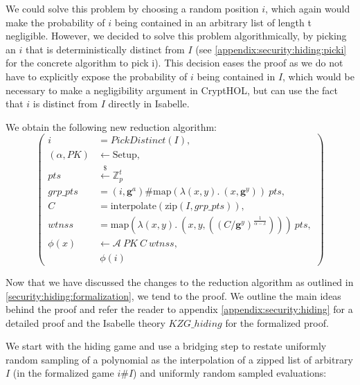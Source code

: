 We could solve this problem by choosing a random position $i$, which again would make the probability of $i$ being contained in an arbitrary list of length t negligible. However, we decided to solve this problem algorithmically, by picking an $i$ that is deterministically distinct from $I$ (see \ref{appendix:security:hiding:picki} for the concrete algorithm to pick i). This decision eases the proof as we do not have to explicitly expose the probability of $i$ being contained in $I$, which would be necessary to make a negligibility argument in CryptHOL, but can use the fact that $i$ is distinct from $I$ directly in Isabelle.

We obtain the following new reduction algorithm: 
\begin{equation*}
    \left(
        \begin{aligned}
            i &= PickDistinct(I), \\
            (\alpha,PK) & \leftarrow \text{Setup}, \\
            pts & \overset{{\scriptscriptstyle\$}}{\leftarrow} \mathbb{Z}_p^t\\
            grp\_pts &= (i,\mathbf{g}^a)\#\text{map} (\lambda (x,y).\ (x,\mathbf{g}^y))\ pts,\\
            C &= \text{interpolate} (\text{zip}(I,grp\_pts)),\\ 
            wtnss &= \text{map} (\lambda (x,y).\ (x,y, ((C/\mathbf{g}^y)^{\frac{1}{\alpha-x}})))\ pts,\\
            \phi(x) & \leftarrow \mathcal{A}\ PK \ C\ wtnss, \\
            & \ \phi(i)
        \end{aligned}
    \right)
\end{equation*}

Now that we have discussed the changes to the reduction algorithm as outlined in \ref{security:hiding:formalization}, we tend to the proof. We outline the main ideas behind the proof and refer the reader to appendix \ref{appendix:security:hiding} for a detailed proof and the Isabelle theory $KZG\_hiding$ for the formalized proof.

We start with the hiding game and use a bridging step to restate uniformly random sampling of a polynomial as the interpolation of a zipped list of arbitrary $I$ (in the formalized game $i\#I$) and uniformly random sampled evaluations: 

